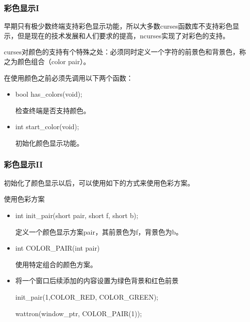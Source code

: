 \documentclass{beamer}
\begin{document}

\begin{frame}
\frametitle{彩色显示I}
早期只有极少数终端支持彩色显示功能，所以大多数curses函数库不支持彩色显示，但是现在的技术发展和人们要求的提高，ncurses实现了对彩色的支持。

curses对颜色的支持有个特殊之处：必须同时定义一个字符的前景色和背景色，称之为颜色组合（color pair）。


\begin{block}{在使用颜色之前必须先调用以下两个函数：}
\begin{itemize}
\item
bool has\_colors(void);

检查终端是否支持颜色。
\item
int start\_color(void);

初始化颜色显示功能。
\end{itemize}
\end{block}

\end{frame}

\begin{frame}
\frametitle{彩色显示II}
初始化了颜色显示以后，可以使用如下的方式来使用色彩方案。

\begin{block}{使用色彩方案}
\begin{itemize}
\item
int init\_pair(short pair, short f, short b);

定义一个颜色显示方案pair，其前景色为f，背景色为b。
\item
int COLOR\_PAIR(int pair)

使用特定组合的颜色方案。
\item
将一个窗口后续添加的内容设置为绿色背景和红色前景

init\_pair(1,COLOR\_RED, COLOR\_GREEN);

wattron(window\_ptr, COLOR\_PAIR(1));
\end{itemize}
\end{block}

\end{frame}
\end{document}
